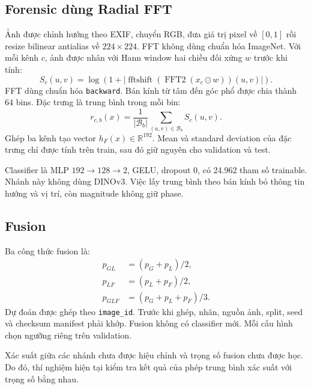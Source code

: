 \subsection{Forensic dùng Radial FFT}
Ảnh được chỉnh hướng theo EXIF, chuyển RGB, đưa giá trị pixel về $[0,1]$ rồi resize bilinear antialias về $224\times224$. FFT không dùng chuẩn hóa ImageNet. Với mỗi kênh $c$, ảnh được nhân với Hann window hai chiều đối xứng $w$ trước khi tính:
\begin{equation}
S_c(u,v)=\log\left(1+
\left|\operatorname{fftshift}(\operatorname{FFT2}(x_c\odot w))(u,v)\right|\right).
\end{equation}
FFT dùng chuẩn hóa \texttt{backward}. Bán kính từ tâm đến góc phổ được chia thành 64 bins. Đặc trưng là trung bình trong mỗi bin:
\begin{equation}
r_{c,b}(x)=\frac1{|\mathcal B_b|}\sum_{(u,v)\in\mathcal B_b}S_c(u,v).
\end{equation}
Ghép ba kênh tạo vector $h_F(x)\in\mathbb R^{192}$. Mean và standard deviation của đặc trưng chỉ được tính trên train, sau đó giữ nguyên cho validation và test.

Classifier là MLP $192\rightarrow128\rightarrow2$, GELU, dropout 0, có 24.962 tham số trainable. Nhánh này không dùng DINOv3. Việc lấy trung bình theo bán kính bỏ thông tin hướng và vị trí, còn magnitude không giữ phase.

\subsection{Fusion}
Ba công thức fusion là:
\begin{align}
p_{GL}&=(p_G+p_L)/2,\\
p_{LF}&=(p_L+p_F)/2,\\
p_{GLF}&=(p_G+p_L+p_F)/3.
\end{align}
Dự đoán được ghép theo \texttt{image\_id}. Trước khi ghép, nhãn, nguồn ảnh, split, seed và checksum manifest phải khớp. Fusion không có classifier mới. Mỗi cấu hình chọn ngưỡng riêng trên validation.

Xác suất giữa các nhánh chưa được hiệu chỉnh và trọng số fusion chưa được học. Do đó, thí nghiệm hiện tại kiểm tra kết quả của phép trung bình xác suất với trọng số bằng nhau.
